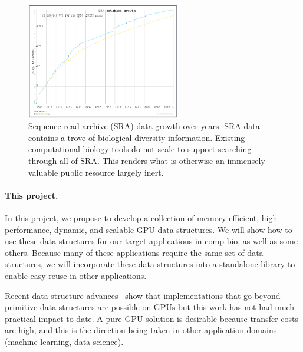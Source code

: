 \setlength\intextsep{0pt}
\begin{figure}
\centering
\includegraphics[width=0.6\textwidth]{images/SRA_data_growth.png}
\caption{Sequence read archive (SRA) data growth over years. SRA data contains a trove of biological diversity information. Existing computational biology tools do not scale to support searching through all of SRA. This renders what is otherwise an immensely valuable public resource largely inert.}
\label{fig:sra_data}
\end{figure}

\paragraph{This project.}
In this project, we propose to develop a  collection of
memory-efficient, high-performance, dynamic, and scalable GPU data structures. 
We will show how to use these data structures for our target applications in comp bio, as well as some others.  
Because many of these applications require the same set of data structures, we will incorporate these data structures into a standalone library to enable easy reuse in other applications.

 Recent data structure advances~\cite{cite-something} show that
implementations that go beyond primitive data structures are possible on GPUs
but this work has not had much practical impact to date.      A pure GPU solution is
desirable because transfer costs are high, and this is the direction being taken
in other application domains (machine learning, data science).


